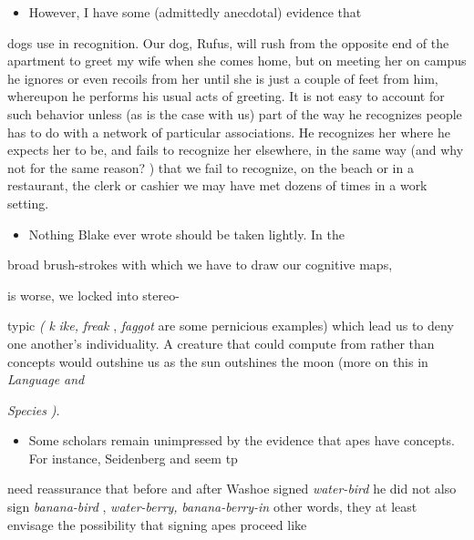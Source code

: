 \begin{itemize}
\begin{itemize}
\begin{itemize}
\begin{itemize}
\begin{itemize}
\begin{itemize}
\begin{itemize}
\begin{itemize}
\begin{itemize}
\begin{itemize}
\begin{itemize}
\begin{itemize}
\begin{itemize}
\item However, I have some (admittedly anecdotal) evidence that
\end{itemize}

dogs use  in recognition. Our dog, Rufus, will rush from the opposite end of the apartment to greet my wife when she comes home, but on meeting her on campus he ignores or even recoils from her until she is just a couple of feet from him, whereupon he performs his usual acts of greeting. It is not easy to account for such behavior unless (as is the case with us) part of the way he recognizes people has to do with a network of particular associations. He recog\-nizes her where he expects her to be, and fails to recognize her else\-where, in the same way (and why not for the same reason? ) that we fail to recognize, on the beach or in a restaurant, the clerk or cashier we may have met dozens of times in a work setting.

\begin{itemize}
\item Nothing Blake ever wrote should be taken lightly. In the
\end{itemize}

broad brush-strokes with which we have to draw our cognitive maps,

is worse, we locked into stereo-

typic \textit{(} \textit{k} \textit{ike,} \textit{freak} , \textit{faggot} are some pernicious examples) which lead us to deny one another's individuality. A creature that could compute from  rather than concepts would out\-shine us as the sun outshines the moon (more on this in \textit{Language and}

\textit{S}\textit{pecies} \textit{).}

\begin{itemize}
\item Some scholars remain unimpressed by the evidence that apes have concepts. For instance, Seidenberg and \citet{Petitto1979} seem tp
\end{itemize}

need reassurance that before and after Washoe signed \textit{water-bird} he did not also sign \textit{banana-bird} , \textit{water-berry,} \textit{banana-berry-in} other words, they at least envisage the possibility that signing apes proceed like


\end{itemize}
\end{itemize}
\end{itemize}
\end{itemize}
\end{itemize}
\end{itemize}
\end{itemize}
\end{itemize}
\end{itemize}
\end{itemize}
\end{itemize}
\end{itemize}

